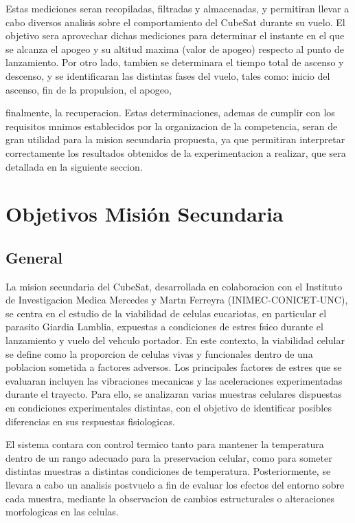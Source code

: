 Estas mediciones seran recopiladas, filtradas y almacenadas, y permitiran llevar a cabo
diversos analisis sobre el comportamiento del CubeSat durante su vuelo.
El objetivo sera aprovechar dichas mediciones para determinar el instante en el que se
alcanza el apogeo y su altitud maxima (valor de apogeo) respecto al punto de lanzamiento.
Por otro lado, tambien se determinara el tiempo total de ascenso y descenso, y se identificaran
las distintas fases del vuelo, tales como: inicio del ascenso, fin de la propulsion, el apogeo,

finalmente, la recuperacion.
Estas determinaciones, ademas de cumplir con los requisitos mnimos establecidos por la
organizacion de la competencia, seran de gran utilidad para la mision secundaria propuesta,
ya que permitiran interpretar correctamente los resultados obtenidos de la experimentacion
a realizar, que sera detallada en la siguiente seccion.

\section{Objetivos Misión Secundaria}
  \subsection{General}
    La mision secundaria del CubeSat, desarrollada en colaboracion con el Instituto de Investigacion
    Medica Mercedes y Martn Ferreyra (INIMEC-CONICET-UNC), se centra en
    el estudio de la viabilidad de celulas eucariotas, en particular el parasito Giardia Lamblia,
    expuestas a condiciones de estres fsico durante el lanzamiento y vuelo del vehculo portador. En
    este contexto, la viabilidad celular se define como la proporcion de celulas vivas y
    funcionales dentro de una poblacion sometida a factores adversos.
    Los principales factores de estres que se evaluaran incluyen las vibraciones mecanicas y
    las aceleraciones experimentadas durante el trayecto. Para ello, se analizaran varias muestras
    celulares dispuestas en condiciones experimentales distintas, con el objetivo de identificar
    posibles diferencias en sus respuestas fisiologicas.

    El sistema contara con control termico tanto para mantener la temperatura dentro de
    un rango adecuado para la preservacion celular, como para someter distintas muestras a
    distintas condiciones de temperatura. Posteriormente, se llevara a cabo un analisis postvuelo a
    fin de evaluar los efectos del entorno sobre cada muestra, mediante la observacion de
    cambios estructurales o alteraciones morfologicas en las celulas.


